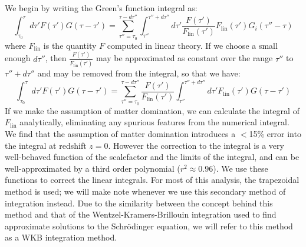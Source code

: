 \documentclass[superscriptaddress,prd]{revtex4}
\begin{document}
We begin by writing the Green's function integral as:
\begin{equation}\label{eqn:wkb}
  \int_{\tau_0}^\tau d\tau' F(\tau')G(\tau-\tau') = \sum_{\tau''=\tau_0}^{\tau-d\tau''} \int_{\tau''}^{\tau''+d\tau''}
  d\tau' \frac{F(\tau')}{F_{\text{lin}}(\tau')} F_{\text{lin}}(\tau') G_i(\tau''-\tau)
\end{equation}
where 
$F_{\text{lin}}$ is the quantity $F$ computed in linear theory. 
If we choose a small enough $d\tau''$, then
$\frac{F(\tau')}{F_{\text{lin}}(\tau')}$ may be approximated as
constant over the range $\tau''$ to $\tau'' + d\tau''$ and may be
removed from the integral, so that we have:
\begin{equation}\label{eqn:wkb2}
  \int_{\tau_0}^\tau d\tau' F(\tau') G(\tau-\tau') =
  \sum_{\tau''=\tau_0}^{\tau-d\tau''} \frac{F(\tau')}{F_{\text{lin}}(\tau')} \int_{\tau''}
  ^{\tau'' + d\tau''} d\tau' F_{\text{lin}}(\tau') G(\tau - \tau')
\end{equation}
If we make the assumption of matter domination, we can calculate the
integral of $F_{\text{lin}}$ analytically, eliminating any spurious 
features from the numerical integral.  We find that the assumption of
matter domination introduces a $<$15\% error into the integral at
redshift $z=0$.  However
the correction to the integral is a very well-behaved function of
the scalefactor and the limits of the integral, and can be
well-approximated by a third order polynomial ($r^2 \approx 0.96$).  We
use these functions to correct the linear integrals.  
For most of this analysis, the trapezoidal
method is used; we will make note whenever we use this
secondary method of integration instead.  Due to the similarity
between the concept behind this method and that of the
Wentzel-Kramers-Brillouin integration used to find approximate
solutions to the Schr\"odinger equation, we will refer to this method
as a WKB integration method.
\end{document}
